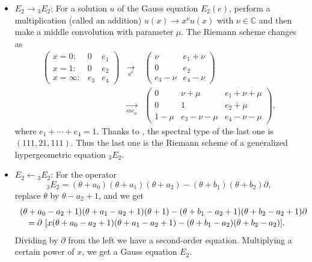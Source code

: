 \documentclass[a4paper,12pt]{article}
\theoremstyle{definition}
\theoremstyle{remark}
\numberwithin{equation}{section} %
\begin{document}
  \begin{itemize}[leftmargin=36pt] %
  \item $E_2\longrightarrow{}_3E_2$: For a solution $u$ of
  the Gauss equation $E_2(e)$, perform a multiplication (called an addition)
  $u(x)\rightarrow x^\nu u(x)$ with $\nu\in\mathbb{C}$
 and then make a middle convolution
  with parameter $\mu$. 
The Riemann scheme changes as
  \[\begin{array}{lcl}   %
    \left(\begin{array}{lll}x=0:&0&e_1\\x=1:&0&e_2\\x=\infty:&e_3&e_4  \end{array}\right) & \underset{x^\nu}\to &
    \left(\begin{array}{ll}\nu&e_1+\nu\\0&e_2\\ e_3-\nu&e_4-\nu \end{array}\right)\\
&  \underset{mc_{\mu}}\to &
\left(\begin{array}{lll}0&\nu+\mu&e_1+\nu+\mu\\ 0&1&e_2+\mu\\ 1-\mu&e_3-\nu-\mu&e_4-\nu-\mu  \end{array}\right),
\end{array}
\] 
where $e_1+\cdots+e_4=1$.
Thanks to \cite[Theorem 5.2]{Osh}, the spectral type of the last one is $(111,21,111)$. 
Thus the last one is the Riemann scheme of
a generalized hypergeometric equation ${}_3E_2$.\medskip

\item $E_2\longleftarrow{}_3E_2$: For the operator
  $${}_3E_2= (\theta+a_0)(\theta+a_1)(\theta+a_2)-(\theta+b_1)(\theta+b_2)\partial,$$
  replace $\theta$ by $\theta-a_2+1$, and we get
  \[ \def\arraystretch{1.1}
  \begin{array}{l}(\theta+a_0-a_2+1)(\theta+a_1-a_2+1)(\theta+1)%
-(\theta+b_1-a_2+1)(\theta+b_2-a_2+1)\partial\\
    \quad =\partial\ [x(\theta+a_0-a_2+1)(\theta+a_1-a_2+1)%
-(\theta+b_1-a_2)(\theta+b_2-a_2)].
  \end{array}\]
  Dividing by $\partial$ from the left we have a second-order equation. Multiplying a certain power of $x$, we get a Gauss equation $E_2$.
  \end{itemize}
\end{document}
